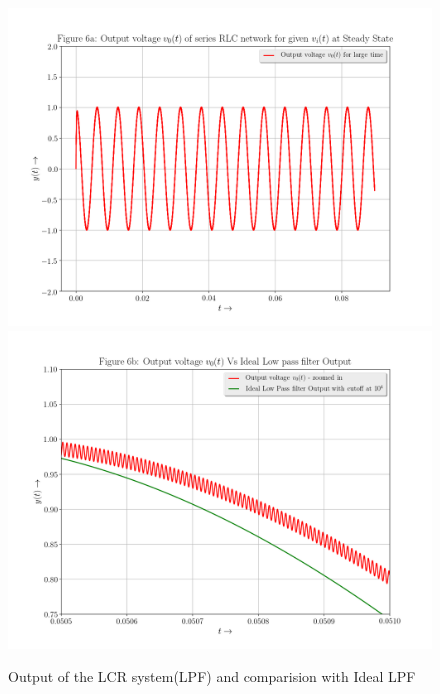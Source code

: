 \documentclass[11pt, a4paper]{article}
\begin{document}
\begin{figure}[!tbh]

  \centering
\includegraphics[scale=0.4]{./../Extras/A66a.png}  %
\includegraphics[scale=0.4]{./../Extras/A66b.png}  %

\caption{Output of the LCR system(LPF) and comparision with Ideal LPF}
\end{figure}
\newpage
\end{document}
